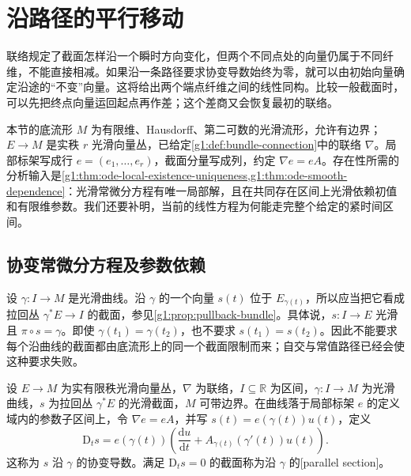 
% 
% 

\section{沿路径的平行移动}
\label{g1:sec:1502}

联络规定了截面怎样沿一个瞬时方向变化，但两个不同点处的向量仍属于不同纤维，不能直接相减。如果沿一条路径要求协变导数始终为零，就可以由初始向量确定沿途的“不变”向量。这将给出两个端点纤维之间的线性同构。比较一般截面时，可以先把终点向量运回起点再作差；这个差商又会恢复最初的联络。

\ProseParagraphBreak

本节的底流形 \(M\) 为有限维、Hausdorff、第二可数的光滑流形，允许有边界；\(E\to M\) 是实秩 \(r\) 光滑向量丛，已给定\cref{g1:def:bundle-connection}中的联络 \(\nabla\)。局部标架写成行 \(e=(e_1,\ldots,e_r)\)，截面分量写成列，约定 \(\nabla e=eA\)。存在性所需的分析输入是\cref{g1:thm:ode-local-existence-uniqueness,g1:thm:ode-smooth-dependence}：光滑常微分方程有唯一局部解，且在共同存在区间上光滑依赖初值和有限维参数。我们还要补明，当前的线性方程为何能走完整个给定的紧时间区间。

\subsection{协变常微分方程及参数依赖}
\label{g1:subsec:1502:01}

设 \(\gamma:I\to M\) 是光滑曲线。沿 \(\gamma\) 的一个向量 \(s(t)\) 位于 \(E_{\gamma(t)}\)，所以应当把它看成拉回丛 \(\gamma^*E\to I\) 的截面，参见\cref{g1:prop:pullback-bundle}。具体说，\(s:I\to E\) 光滑且 \(\pi\circ s=\gamma\)。即使 \(\gamma(t_1)=\gamma(t_2)\)，也不要求 \(s(t_1)=s(t_2)\)。因此不能要求每个沿曲线的截面都由底流形上的同一个截面限制而来；自交与常值路径已经会使这种要求失败。

\begin{definition}\label{g1:def:along-curve-covariant-derivative}
	设 \(E\to M\) 为实有限秩光滑向量丛，\(\nabla\) 为联络，\(I\subseteq\mathbb R\) 为区间，\(\gamma:I\to M\) 为光滑曲线，\(s\) 为拉回丛 \(\gamma^*E\) 的光滑截面，\(M\) 可带边界。在曲线落于局部标架 \(e\) 的定义域内的参数子区间上，令 \(\nabla e=eA\)，并写 \(s(t)=e(\gamma(t))u(t)\)，定义
	\begin{equation}\label{g1:eq:along-curve-covariant-derivative}
		\mathrm{D}_t s=e(\gamma(t))\left(\frac{\mathrm{d}u}{\mathrm{d}t}+A_{\gamma(t)}(\gamma'(t))u(t)\right).
	\end{equation}
	这称为 \(s\) 沿 \(\gamma\) 的协变导数。满足 \(\mathrm{D}_t s=0\) 的截面称为沿 \(\gamma\) 的[parallel section]。
\end{definition}


